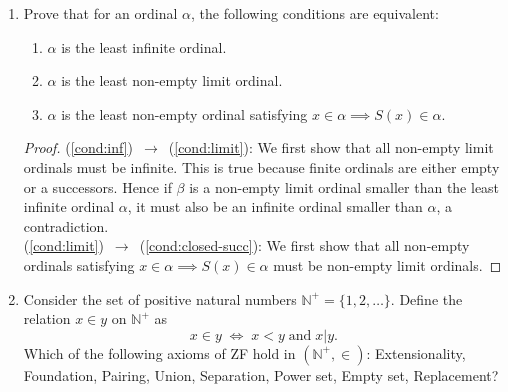\documentclass{article}
\begin{document}
\begin{enumerate}
\begin{proof}
      Now we show that $\alpha$ is the least ordinal satisfying this
      property. Let $\beta$ be an ordinal smaller than $\alpha=\cup X$. By
      Theorem 1.14.3, $\beta$ must be contained in $\alpha$, which means it
      is contained in some ordinal $x$ in $X$. By Theorem 1.14.3 again,
      $\beta$ cannot be larger or equal to $x$.
    \end{proof}

  \item Prove that for an ordinal $\alpha$, the following conditions are
    equivalent:
    \begin{enumerate}
      \item $\alpha$ is the least infinite ordinal. \label{cond:inf}
      \item $\alpha$ is the least non-empty limit ordinal.
        \label{cond:limit}
      \item $\alpha$ is the least non-empty ordinal satisfying
        $x\in\alpha\implies S(x)\in\alpha$. \label{cond:closed-succ}
    \end{enumerate}

    \begin{proof}
      (\ref{cond:inf})~$\rightarrow$~(\ref{cond:limit}): We first show that all
      non-empty limit ordinals must be infinite. This is true because
      finite ordinals are either empty or a successors. Hence if $\beta$
      is a non-empty limit ordinal smaller than the least infinite ordinal
      $\alpha$, it must also be an infinite ordinal smaller than $\alpha$,
      a contradiction. \\

      (\ref{cond:limit})~$\rightarrow$~(\ref{cond:closed-succ}): We first
      show that all non-empty ordinals satisfying $x\in\alpha\implies
      S(x)\in\alpha$ must be non-empty limit ordinals.
    \end{proof}

  \item Consider the set of positive natural numbers
    $\mathbb{N}^+=\{1,2,\ldots\}$. Define the relation $x\in y$ on
    $\mathbb{N}^+$ as
    \begin{equation*}
      x\in y\; \Leftrightarrow\; x<y\; \text{and}\; x|y.
    \end{equation*}
    Which of the following axioms of ZF hold in $(\mathbb{N}^+,\in)$:
    Extensionality, Foundation, Pairing, Union, Separation, Power set,
    Empty set, Replacement?
\end{enumerate}
\end{document}
